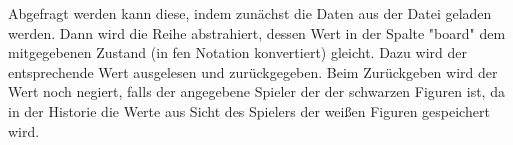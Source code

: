     Abgefragt werden kann diese, indem zunächst die Daten aus der Datei
geladen werden. Dann wird die Reihe abstrahiert, dessen Wert in der
Spalte "board" dem mitgegebenen Zustand (in fen Notation konvertiert)
gleicht. Dazu wird der entsprechende Wert ausgelesen und zurückgegeben.
Beim Zurückgeben wird der Wert noch negiert, falls der angegebene
Spieler der der schwarzen Figuren ist, da in der Historie die Werte aus
Sicht des Spielers der weißen Figuren gespeichert wird.



